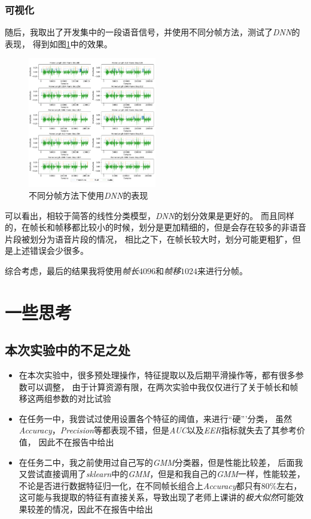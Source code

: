 \documentclass[a4paper]{article}
\begin{document}
\subsubsection{可视化}
随后，我取出了开发集中的一段语音信号，并使用不同分帧方法，测试了\emph{DNN}的表现，
得到如图\ref{fig:results DNN}中的效果。
\begin{figure}[ht]
  \centering
  \includegraphics[width=0.5\textwidth]{figs/visualize_results_DNN.pdf}
  \caption{不同分帧方法下使用\emph{DNN}的表现}
  \label{fig:results DNN}
\end{figure}

可以看出，相较于简答的线性分类模型，\emph{DNN}的划分效果是更好的。
而且同样的，在帧长和帧移都比较小的时候，划分是更加精细的，但是会存在较多的非语音片段被划分为语音片段的情况，
相比之下，在帧长较大时，划分可能更粗犷，但是上述错误会少很多。

综合考虑，最后的结果我将使用\emph{帧长$4096$}和\emph{帧移$1024$}来进行分帧。

\section{一些思考}
\subsection{本次实验中的不足之处}
\begin{itemize}
  \item 在本次实验中，很多预处理操作，特征提取以及后期平滑操作等，都有很多参数可以调整，
  由于计算资源有限，在两次实验中我仅仅进行了关于帧长和帧移这两组参数的对比试验
  \item 在任务一中，我尝试过使用设置各个特征的阈值，来进行“硬”’分类，
  虽然\emph{Accuracy}，\emph{Precision}等都表现不错，但是\emph{AUC}以及\emph{EER}指标就失去了其参考价值，
  因此不在报告中给出
  \item 在任务二中，我之前使用过自己写的\emph{GMM}分类器，但是性能比较差，
  后面我又尝试直接调用了\emph{sklearn}中的\emph{GMM}，但是和我自己的\emph{GMM}一样，性能较差，
  不论是否进行数据特征归一化，在不同帧长组合上\emph{Accuracy}都只有$80\%$左右，
  这可能与我提取的特征有直接关系，导致出现了老师上课讲的\emph{极大似然}可能效果较差的情况，因此不在报告中给出
\end{itemize}
\end{document}
